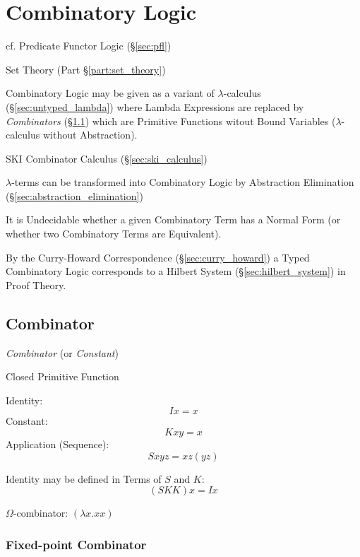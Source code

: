 \section{Combinatory Logic}\label{sec:combinatory_logic}

cf. Predicate Functor Logic (\S\ref{sec:pfl})

Set Theory (Part \S\ref{part:set_theory})

Combinatory Logic may be given as a variant of $\lambda$-calculus
(\S\ref{sec:untyped_lambda}) where Lambda Expressions are replaced by
\emph{Combinators} (\S\ref{sec:combinator}) which are Primitive
Functions witout Bound Variables ($\lambda$-calculus without
Abstraction).

SKI Combinator Calculus (\S\ref{sec:ski_calculus})

$\lambda$-terms can be transformed into Combinatory Logic by
Abstraction Elimination (\S\ref{sec:abstraction_elimination})

It is Undecidable whether a given Combinatory Term has a Normal Form
(or whether two Combinatory Terms are Equivalent).

By the Curry-Howard Correspondence (\S\ref{sec:curry_howard}) a Typed
Combinatory Logic corresponds to a Hilbert System
(\S\ref{sec:hilbert_system}) in Proof Theory.



\subsection{Combinator}\label{sec:combinator}

\emph{Combinator} (or \emph{Constant})

Closed Primitive Function

Identity:
\[
  I x = x
\]
Constant:
\[
  K x y = x
\]
Application (Sequence):
\[
  S x y z = x z (y z)
\]

Identity may be defined in Terms of $S$ and $K$:
\[
  (S K K) x = I x
\]

$\Omega$-combinator: $(\lambda x. x x)$



\subsubsection{Fixed-point Combinator}\label{sec:fixedpoint_combinator}

